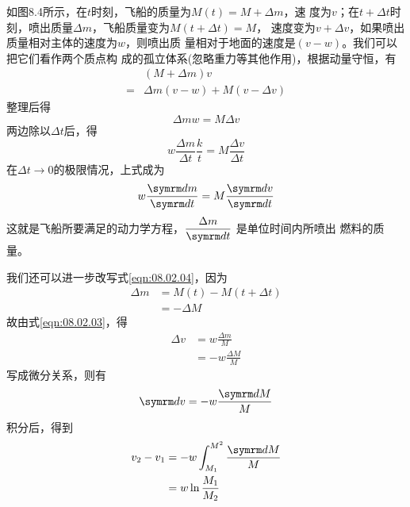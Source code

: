 如图8.4所示，在$ t $时刻，飞船的质量为$  M \left( t \right) = M + \Delta m $，速
度为$ v $；在$ t + \Delta t $时刻，喷出质量$ \Delta m $，飞船质量变为$ M \left( t + \Delta t \right) = M $， 
速度变为$ v + \Delta v $，如果喷出质量相对主体的速度为$ w $，则喷出质
量相对于地面的速度是$ \left( v - w \right) $。我们可以把它们看作两个质点构
成的孤立体系(忽略重力等其他作用)，根据动量守恒，有
\begin{equation*}
	\begin{split}
		  & \left( M + \Delta m \right) v \\  
		= & \Delta m \left( v - w \right) + M \left( v - \Delta v \right)  
	\end{split}
\end{equation*}
整理后得
\begin{equation}\label{eqn:08.02.03}
	\Delta m w = M \Delta v  
\end{equation}
两边除以$ \Delta t $后，得
\begin{equation*}
	w \frac { \Delta m } { \Delta t } \frac { k } { t } = M \frac { \Delta v } { \Delta t } 
\end{equation*}
在$ \Delta t \to 0 $的极限情况，上式成为
\begin{equation}\label{eqn:08.02.04}
	w \frac { \dif m } { \dif t } = M \frac { \dif v } { \dif t }  
\end{equation}
这就是飞船所要满足的动力学方程，$ \dfrac { \Delta m } { \dif t } $
是单位时间内所喷出
燃料的质量。

我们还可以进一步改写式\eqref{eqn:08.02.04}，因为
\begin{equation*}
	\begin{split}
		\Delta m & = M \left( t \right) - M \left( t + \Delta t \right) \\  
		& = - \Delta M  
	\end{split}
\end{equation*}
故由式\eqref{eqn:08.02.03}，得
\begin{equation*}
	\begin{split}
	\Delta v &= w \frac { \Delta m } { M } \\  
			& = - w \frac { \Delta M } { M }  
	\end{split}
\end{equation*}
写成微分关系，则有
\begin{equation*}
	\dif v = - w \frac { \dif M } { M }  
\end{equation*}
积分后，得到
\begin{equation*}
	\begin{split}
		v _ { 2 } - v _ { 1 } & = - w \int _ { M _ { 1 } } ^ { M ^ { 2 } } \frac { \dif M } { M } \\  
			& = w \ln \frac { M _ { 1 } } { M _ { 2 } }  
	\end{split}
\end{equation*}

